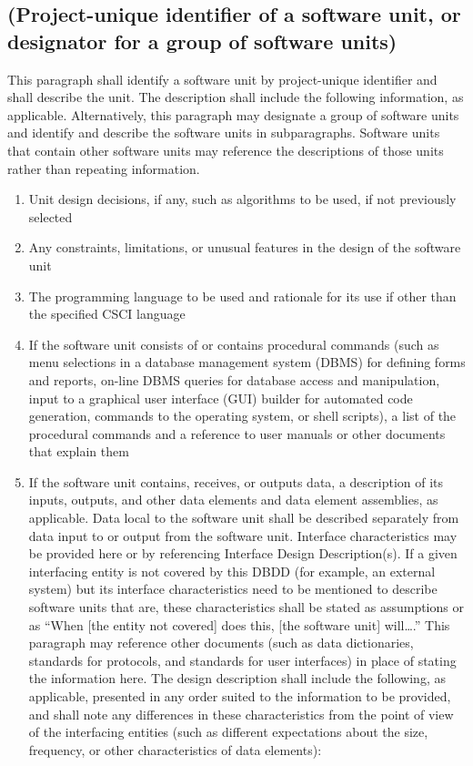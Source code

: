 \subsection{(Project-unique identifier of a software unit, or
designator for a group of software units)}

This paragraph shall identify a software unit by project-unique
identifier and shall describe the unit. The description shall include
the following information, as applicable. Alternatively, this paragraph
may designate a group of software units and identify and describe the
software units in subparagraphs. Software units that contain other
software units may reference the descriptions of those units rather than
repeating information.

\begin{enumerate}
\itemsep1pt\parskip0pt
\item
  Unit design decisions, if any, such as algorithms to be used, if not
  previously selected
\item
  Any constraints, limitations, or unusual features in the design of the
  software unit
\item
  The programming language to be used and rationale for its use if other
  than the specified CSCI language
\item
  If the software unit consists of or contains procedural commands (such
  as menu selections in a database management system (DBMS) for defining
  forms and reports, on-line DBMS queries for database access and
  manipulation, input to a graphical user interface (GUI) builder for
  automated code generation, commands to the operating system, or shell
  scripts), a list of the procedural commands and a reference to user
  manuals or other documents that explain them
\item
  If the software unit contains, receives, or outputs data, a
  description of its inputs, outputs, and other data elements and data
  element assemblies, as applicable. Data local to the software unit
  shall be described separately from data input to or output from the
  software unit. Interface characteristics may be provided here or by
  referencing Interface Design Description(s). If a given interfacing
  entity is not covered by this DBDD (for example, an external system)
  but its interface characteristics need to be mentioned to describe
  software units that are, these characteristics shall be stated as
  assumptions or as ``When {[}the entity not covered{]} does this,
  {[}the software unit{]} will\ldots{}.'' This paragraph may reference
  other documents (such as data dictionaries, standards for protocols,
  and standards for user interfaces) in place of stating the information
  here. The design description shall include the following, as
  applicable, presented in any order suited to the information to be
  provided, and shall note any differences in these characteristics from
  the point of view of the interfacing entities (such as different
  expectations about the size, frequency, or other characteristics of
  data elements):


\end{enumerate}
